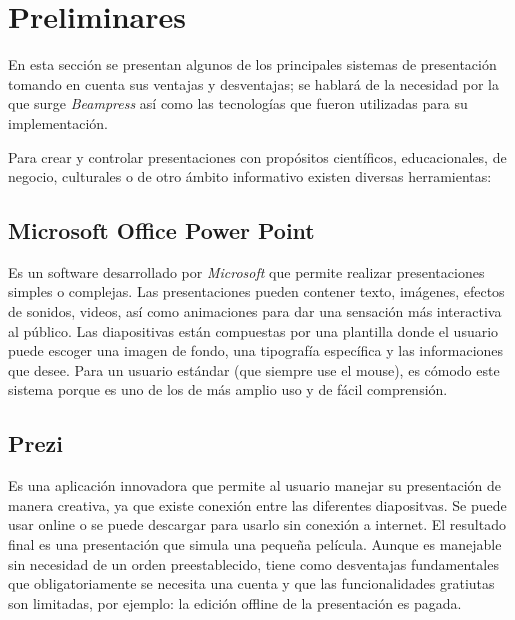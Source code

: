 \chapter{Preliminares} %
\label{cha:preliminares}
	En esta sección se presentan algunos de los principales sistemas de presentación tomando en cuenta sus ventajas y desventajas; se hablará de la necesidad por la que surge \textit{Beampress} así como las tecnologías que fueron utilizadas para su implementación.


	Para crear y controlar presentaciones con propósitos científicos, educacionales, de negocio, culturales o de otro ámbito informativo existen diversas herramientas:	

	\section{Microsoft Office Power Point} %
	\label{sec:microsoft_office_power_point}

		Es un software desarrollado por \textit{Microsoft}  que permite realizar presentaciones simples o complejas. Las presentaciones pueden contener texto, imágenes, efectos de sonidos, videos, así como animaciones para dar una sensación más interactiva al público. Las diapositivas están compuestas por una plantilla donde el usuario puede escoger una imagen de fondo, una tipografía específica y las informaciones que desee. Para un usuario estándar (que siempre use el mouse), es cómodo este sistema porque es uno de los de más amplio uso y de fácil comprensión.


	\section{Prezi} %
	\label{sec:prezi}

		Es una aplicación innovadora que permite al usuario manejar su presentación de manera creativa, ya que existe conexión entre las diferentes diapositvas. Se puede usar online o se puede descargar para usarlo sin conexión a internet. El resultado final es una presentación que simula una pequeña película. Aunque es manejable sin necesidad de un orden preestablecido, tiene como desventajas fundamentales que obligatoriamente se necesita una cuenta y que las funcionalidades gratiutas son limitadas, por ejemplo: la edición offline de la presentación es pagada.		

